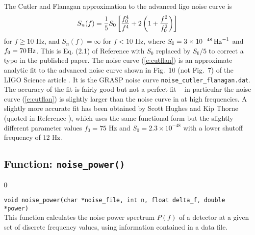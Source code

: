 The Cutler and Flanagan approximation to the advanced ligo noise curve is
\begin{equation}
\label{e:cutflan}
S_n(f) = {1 \over 5} S_0  \left[{f_0^4 \over f^4} +2 \left(1  + {f^2
\over f_0^2} \right) \right]
\end{equation}
for $f \ge 10$ Hz, and $S_n(f) = \infty$ for $f < 10$ Hz, where $S_0
= 3 \times 10^{-48} \, {\rm Hz}^{-1}$ and $f_0 = 70 \,{\rm Hz}$.
This is Eq. (2.1) of Reference \cite{cutler:1994} with $S_0$ replaced
by $S_0/5$ to correct a typo in the published paper.  The noise curve
(\ref{e:cutflan}) is an approximate analytic fit to the advanced noise
curve shown in Fig.\ 10 (not Fig.\ 7) of the LIGO Science article
\cite{Science92}.  
It is the GRASP noise curve {\tt noise\_cutler\_flanagan.dat}.
The accuracy of the fit is fairly good but not a
perfect fit -- in particular the noise curve (\ref{e:cutflan}) is slightly
larger than the noise curve in \cite{Science92} at high frequencies.
A slightly more accurate fit has been obtained by Scott Hughes and
Kip Thorne (quoted in Reference \cite{OwenSathya}), which uses the same
functional form but the slightly different parameter values $f_0 = 75$ Hz
and $S_0 = 2.3 \times 10^{-48}$ with a lower shutoff frequency of $12$ Hz.
\clearpage


\subsection{Function: {\tt noise\_power()}}
\label{subsec:noise_power}
\setcounter{equation}0

{\tt void noise\_power(char *noise\_file, int n, float delta\_f,
double *power)}\\
%
This function calculates the noise power spectrum $P(f)$ of a detector
at a given set of discrete frequency values, using information contained 
in a data file.

